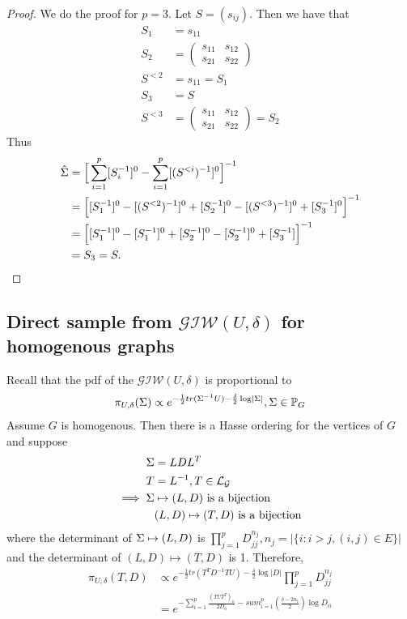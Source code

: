 \documentclass[12pt, leqno]{article}
\providecommand{\abs}[1]{\lvert#1\rvert}
\let\oldhat\hat
\renewcommand{\hat}[1]{\oldhat{{#1}}}
\def\s{\ensuremath\Sigma}
\def\pg{\ensuremath\mathbb{P}_{{G}}}
\begin{document}
\begin{proof}
We do the proof for $p = 3$. Let $S = (s_{ij})$. Then we have that 
\begin{align*}
S_1 &= s_{11} \\
S_2 &= 
\begin{pmatrix}
s_{11} & s_{12}\\
s_{21} & s_{22}
\end{pmatrix} \\
S^{<2} &= s_{11} = S_1\\
S_3 &= S\\
S^{<3} &= \begin{pmatrix}
s_{11} & s_{12}\\
s_{21} & s_{22}
\end{pmatrix}  = S_2
\end{align*}
Thus 
\begin{align*}
\hat{\s} &= \Big[\sum_{i=1}^p[S_i^{-1}]^0-\sum_{i=1}^p[(S^{<i} )^{-1}]^0
  \Big]^{-1} \\
&= \Big[[S_1^{-1}]^0-[(S^{<2} )^{-1}]^0+[S_2^{-1}]^0-[(S^{<3} )^{-1}]^0+[S_3^{-1}]^0
  \Big]^{-1} \\
&= \Big[[S_1^{-1}]^0-[S_1^{-1}]^0+[S_2^{-1}]^0-[S_2^{-1}]^0+[S_3^{-1}]
  \Big]^{-1} \\
&= S_3 = S.
\end{align*}
\end{proof}

\subsection{Direct sample from $\mathcal{GIW}(U,\delta)$ for
  homogenous graphs}
Recall that the pdf of the $\mathcal{GIW}(U,\delta)$ is proportional
to
\begin{align*}
\pi_{U,\delta}(\s) \propto
  e^{-\frac{1}{2}tr(\s^{-1}U)-\frac{\delta}{2}\log \abs{\s}}, \s \in \pg
\end{align*}
Assume $G$ is homogenous. Then there is a Hasse ordering for the
vertices of $G$ and suppose 
\begin{align*}
\s &= LDL^{T} \\
T &= L^{-1}, T \in \mathcal{L}_{\mathcal{G}} \\
\implies \s & \mapsto (L,D) \text{ is a bijection} \\ & (L,D) \mapsto (T,D) \text{ is a bijection}
\end{align*}
where the determinant of $\s \mapsto (L,D)$ is $\prod_{j=1}^p
D_{jj}^{n_j}, n_j = \abs{\{i:i>j,(i,j) \in E\}}$ and the determinant
of $(L,D) \mapsto (T,D)$ is 1.
Therefore, 
\begin{align*}
\pi_{U,\delta}(T,D) &\propto
  e^{-\frac{1}{2}tr(T^T D^{-1} T U)-\frac{\delta}{2}\log \abs{D}} \prod_{j=1}^p
D_{jj}^{n_j}\\
&= e^{-\sum_{i=1}^p \frac{(TUT^T)_{ii}}{2D_{ii}}-sum_{i=1}^p
  (\frac{\delta-2n_i}{2})\log D_{ii}} 
\end{align*}
\end{document}
